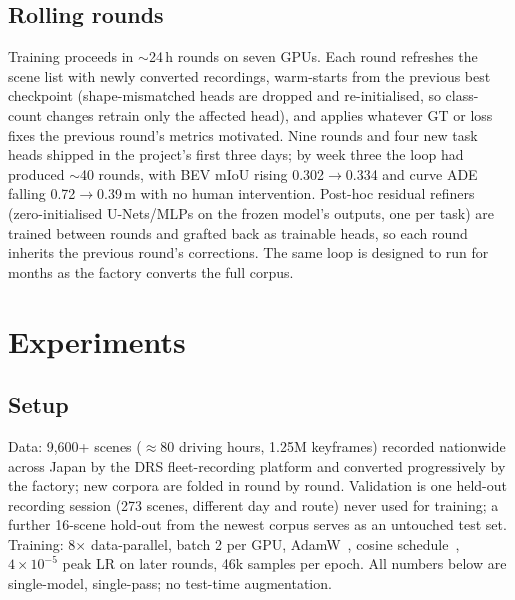\documentclass[10pt,twocolumn]{article}
\begin{document}
\subsection{Rolling rounds}
Training proceeds in $\sim$24\,h rounds on seven GPUs. Each round refreshes
the scene list with newly converted recordings, warm-starts from the previous
best checkpoint (shape-mismatched heads are dropped and re-initialised, so
class-count changes retrain only the affected head), and applies whatever GT
or loss fixes the previous round's metrics motivated. Nine rounds and four new
task heads shipped in the project's first three days; by week three the loop
had produced $\sim$40 rounds, with BEV mIoU rising 0.302$\to$0.334 and curve
ADE falling 0.72$\to$0.39\,m with no human intervention. Post-hoc residual
refiners (zero-initialised U-Nets/MLPs on the frozen model's outputs, one per
task) are trained between rounds and grafted back as trainable heads, so
each round inherits the previous round's corrections. The same loop is
designed to run for months as the factory converts the full corpus.

\section{Experiments}
\label{sec:exp}

\subsection{Setup}
Data: 9{,}600+ scenes ($\approx$80 driving hours, 1.25M keyframes) recorded
nationwide across Japan by the DRS fleet-recording platform and converted
progressively by the factory; new corpora are folded in round by round.
Validation is one held-out recording session (273 scenes, different day and
route) never used for training; a further 16-scene hold-out from the newest
corpus serves as an untouched test set. Training: 8$\times$ data-parallel,
batch 2 per GPU, AdamW~\citep{kingma2015adam,loshchilov2019adamw}, cosine
schedule~\citep{loshchilov2017sgdr}, $4{\times}10^{-5}$ peak LR on later
rounds, 46k samples per epoch.
All numbers below are single-model, single-pass; no test-time augmentation.
\end{document}
